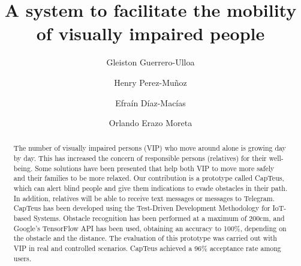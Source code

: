 \documentclass{svproc}
\begin{document}
\mainmatter              %
%
\title{A system to facilitate the mobility of visually impaired people}
%
%
\author{Gleiston Guerrero-Ulloa \and Henry Perez-Mu\~{n}oz \and
Efra\'{i}n D\'{i}az-Mac\'{i}as \and Orlando Erazo Moreta}
%
%
%

\maketitle              %

\begin{abstract}
The number of visually impaired persons (VIP) who move
around alone is growing day by day. This has increased the concern of
responsible persons (relatives) for their well-being. Some solutions have
been presented that help both VIP to move more safely and their families
to be more relaxed. Our contribution is a prototype called CapTeus,
which can alert blind people and give them indications to evade obstacles
in their path. In addition, relatives will be able to receive text messages
or messages to Telegram. CapTeus has been developed using the
Test-Driven Development Methodology for IoT-based Systems. Obstacle
recognition has been performed at a maximum of 200cm, and Google’s
TensorFlow API has been used, obtaining an accuracy to 100\%, depending
on the obstacle and the distance. The evaluation of this prototype was
carried out with VIP in real and controlled scenarios. CapTeus achieved
a 96\% acceptance rate among users.
\end{abstract}
%
\end{document}
